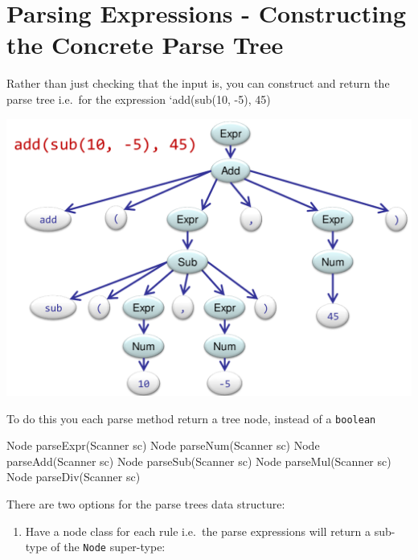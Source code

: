 \documentclass[
]{book}
\newenvironment{Shaded}{\begin{snugshade}}{\end{snugshade}}
\newcommand{\BuiltInTok}[1]{#1}
\newcommand{\FunctionTok}[1]{\textcolor[rgb]{0.00,0.00,0.00}{#1}}
\newcommand{\NormalTok}[1]{#1}
\providecommand{\tightlist}{%
  \setlength{\itemsep}{0pt}\setlength{\parskip}{0pt}}
\begin{document}
\hypertarget{parsing-expressions---constructing-the-concrete-parse-tree}{%
\section{Parsing Expressions - Constructing the Concrete Parse Tree}\label{parsing-expressions---constructing-the-concrete-parse-tree}}

Rather than just checking that the input is, you can construct and return the parse tree i.e.~for the expression `add(sub(10, -5), 45)

\includegraphics{img/09-image07.png}

To do this you {each parse method} return a tree node, instead of a \texttt{boolean}

\begin{Shaded}
\begin{Highlighting}[]
\BuiltInTok{Node} \FunctionTok{parseExpr}\NormalTok{(}\BuiltInTok{Scanner}\NormalTok{ sc)}
\BuiltInTok{Node} \FunctionTok{parseNum}\NormalTok{(}\BuiltInTok{Scanner}\NormalTok{ sc)}
\BuiltInTok{Node} \FunctionTok{parseAdd}\NormalTok{(}\BuiltInTok{Scanner}\NormalTok{ sc)}
\BuiltInTok{Node} \FunctionTok{parseSub}\NormalTok{(}\BuiltInTok{Scanner}\NormalTok{ sc)}
\BuiltInTok{Node} \FunctionTok{parseMul}\NormalTok{(}\BuiltInTok{Scanner}\NormalTok{ sc)}
\BuiltInTok{Node} \FunctionTok{parseDiv}\NormalTok{(}\BuiltInTok{Scanner}\NormalTok{ sc)}
\end{Highlighting}
\end{Shaded}

There are two options for the parse trees data structure:

\begin{enumerate}
\def\labelenumi{\arabic{enumi}.}
\tightlist
\item
  Have a node class for each rule i.e.~the parse expressions will return a sub-type of the \texttt{Node} super-type:
\end{enumerate}
\end{document}
